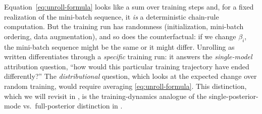 \documentclass[11pt]{article}
\begin{document}
\begin{remark}\label{rem:unroll-vs-if}
Equation~\eqref{eq:unroll-formula} looks like a sum over training steps and, for a fixed realization of the mini-batch sequence, it \emph{is} a deterministic chain-rule computation. But the training run has randomness (initialization, mini-batch ordering, data augmentation), and so does the counterfactual: if we change $\beta_i$, the mini-batch sequence might be the same or it might differ. Unrolling as written differentiates through a \emph{specific} training run: it answers the \emph{single-model} attribution question, ``how would this particular training trajectory have ended differently?''\! The \emph{distributional} question, which looks at the expected change over random training, would require averaging \eqref{eq:unroll-formula}. This distinction, which we will revisit in , is the training-dynamics analogue of the single-posterior-mode vs.\ full-posterior distinction in .
\end{remark}
\end{document}
